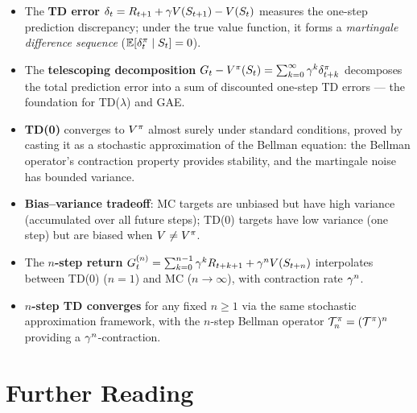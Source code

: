 \documentclass[11pt,a4paper]{article}
\begin{document}
\begin{itemize}
  \item The \textbf{TD error}
    $\delta_t = R_{t+1} + \gamma V(S_{t+1}) - V(S_t)$ measures the
    one-step prediction discrepancy; under the true value function, it
    forms a \emph{martingale difference sequence}
    ($\mathbb{E}[\delta_t^\pi \mid S_t] = 0$).

  \item The \textbf{telescoping decomposition}
    $G_t - V^{\pi}(S_t) = \sum_{k=0}^\infty \gamma^k
    \delta_{t+k}^\pi$ decomposes the total prediction error into
    a sum of discounted one-step TD errors --- the foundation for
    TD($\lambda$) and GAE.

  \item \textbf{TD(0)} converges to $V^{\pi}$ almost surely under standard
    conditions, proved by casting it as a stochastic approximation of
    the Bellman equation: the Bellman operator's contraction property
    provides stability, and the martingale noise has bounded variance.

  \item \textbf{Bias--variance tradeoff}: MC targets are unbiased but
    have high variance (accumulated over all future steps); TD(0)
    targets have low variance (one step) but are biased when
    $V \neq V^{\pi}$.

  \item The \textbf{$n$-step return}
    $G_t^{(n)} = \sum_{k=0}^{n-1} \gamma^k R_{t+k+1}
    + \gamma^n V(S_{t+n})$ interpolates between TD(0) ($n=1$) and
    MC ($n \to \infty$), with contraction rate $\gamma^n$.

  \item \textbf{$n$-step TD converges} for any fixed $n \geq 1$ via
    the same stochastic approximation framework, with the $n$-step
    Bellman operator $\mathcal{T}_n^\pi = (\mathcal{T}^\pi)^n$
    providing a $\gamma^n$-contraction.
\end{itemize}

\section{Further Reading}
\label{sec:further_reading}
\end{document}
